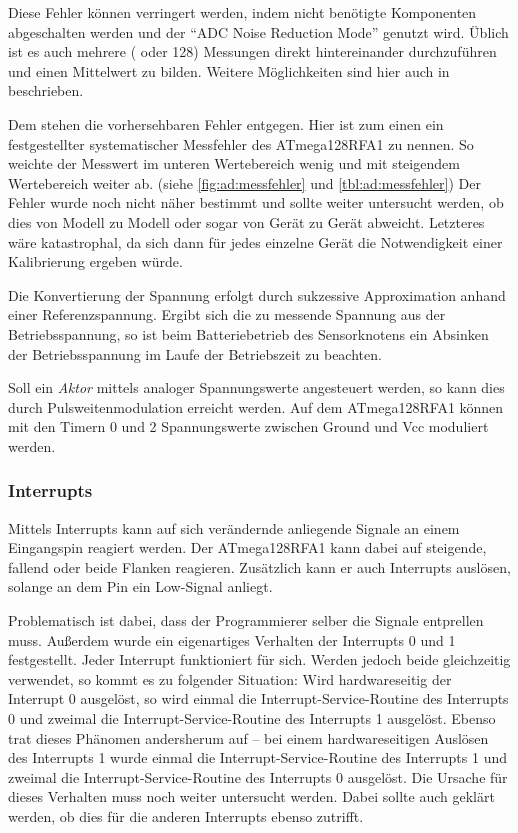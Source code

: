 	Diese Fehler können verringert werden, indem nicht benötigte Komponenten
	abgeschalten werden und  der \enquote{ADC Noise Reduction Mode}
	\autocite[][S.\,159]{atmega128rfa1} genutzt wird.  Üblich ist es auch
	mehrere ( oder 128) Messungen direkt hintereinander durchzuführen
	und einen Mittelwert zu bilden.  Weitere Möglichkeiten sind hier
	auch in \autocite[][S.\,422]{atmega128rfa1} beschrieben.

	Dem stehen die vorhersehbaren Fehler entgegen.  Hier ist zum einen ein
	festgestellter systematischer Messfehler des ATmega128RFA1 zu nennen.
	So weichte der Messwert im unteren Wertebereich wenig und mit steigendem
	Wertebereich weiter ab. (siehe \autoref{fig:ad:messfehler} und \autoref{tbl:ad:messfehler})
	Der Fehler wurde noch nicht näher bestimmt und sollte weiter untersucht
	werden, ob dies von Modell zu Modell oder sogar von Gerät zu Gerät
	abweicht.  Letzteres wäre katastrophal, da sich dann für jedes einzelne
	Gerät die Notwendigkeit einer Kalibrierung ergeben würde.

	Die Konvertierung der Spannung erfolgt durch sukzessive Approximation
	\autocite[][S.\,412]{atmega128rfa1} anhand einer Referenzspannung.
	Ergibt sich die zu messende Spannung aus der Betriebsspannung, so ist
	beim Batteriebetrieb des Sensorknotens ein Absinken der Betriebsspannung
	im Laufe der Betriebszeit zu beachten.

	Soll ein \emph{Aktor} mittels analoger Spannungswerte angesteuert werden,
	so kann dies durch Pulsweitenmodulation erreicht werden.  Auf dem
	ATmega128RFA1 können mit den Timern 0 und 2 Spannungswerte zwischen
	Ground und Vcc moduliert werden.

\subsubsection{Interrupts}
	Mittels Interrupts kann auf sich verändernde anliegende Signale
	an einem Eingangspin reagiert werden.  Der ATmega128RFA1 kann dabei
	auf steigende, fallend oder beide Flanken reagieren.  Zusätzlich kann er
	auch Interrupts auslösen, solange an dem Pin ein Low-Signal anliegt.
	\autocite[][S.\,220]{atmega128rfa1}

	Problematisch ist dabei, dass der Programmierer selber die Signale
	entprellen muss.  Außerdem wurde ein eigenartiges Verhalten
	der Interrupts 0 und 1 festgestellt.  Jeder Interrupt funktioniert für
	sich.
	Werden jedoch beide gleichzeitig verwendet, so kommt
	es zu folgender Situation:  Wird hardwareseitig der Interrupt
	0 ausgelöst, so wird einmal die Interrupt-Service-Routine
	des Interrupts 0 und zweimal die Interrupt-Service-Routine des
	Interrupts 1 ausgelöst.  Ebenso trat dieses Phänomen andersherum
	auf -- bei einem hardwareseitigen Auslösen des Interrupts 1
	wurde einmal die Interrupt-Service-Routine des Interrupts 1 und
	zweimal die Interrupt-Service-Routine des Interrupts 0 ausgelöst.
	Die Ursache für dieses Verhalten muss noch weiter untersucht werden.
	Dabei sollte auch geklärt werden, ob dies für die anderen Interrupts
	ebenso zutrifft.


